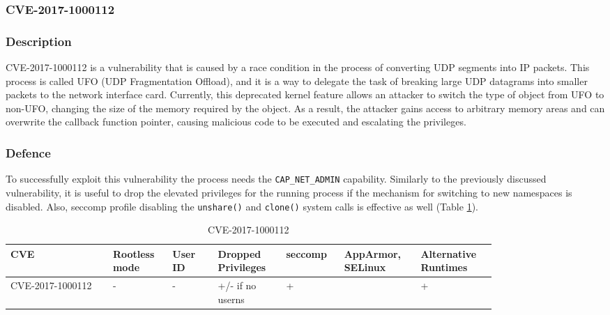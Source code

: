 \subsubsection{CVE-2017-1000112}
\subsubsection*{Description}

CVE-2017-1000112 is a vulnerability that is caused by a race condition in the process of converting UDP segments into IP packets. This process is called UFO (UDP Fragmentation Offload), and it is a way to delegate the task of breaking large UDP datagrams into smaller packets to the network interface card. Currently, this deprecated kernel feature allows an attacker to switch the type of object from UFO to non-UFO, changing the size of the memory required by the object. As a result, the attacker gains access to arbitrary memory areas and can overwrite the callback function pointer, causing malicious code to be executed and escalating the privileges.

\subsubsection*{Defence}

To successfully exploit this vulnerability the process needs the \texttt{CAP\_NET\_ADMIN} capability. Similarly to the previously discussed vulnerability, it is useful to drop the elevated privileges for the running process if the mechanism for switching to new namespaces is disabled. Also, seccomp profile disabling the \texttt{unshare()} and \texttt{clone()} system calls is effective as well (Table \ref{tab:h:7}).

\begin{table}[H]
    \centering \small
    \begin{tabular}{| p{0.18\linewidth} | p{0.1\linewidth} | p{0.08\linewidth} | p{0.12\linewidth} | p{0.09\linewidth} | p{0.12\linewidth} | p{0.12\linewidth} |} \hline
    CVE & Rootless mode & User ID & Dropped Privileges & seccomp & AppArmor, SELinux & Alternative Runtimes \\ \hline
    CVE-2017-1000112 & - & - & \cellcolor{yellow!25} +/- \linebreak if no userns & \cellcolor{green!25} + &  & \cellcolor{green!25} + \\ \hline
    \end{tabular}
    \caption{CVE-2017-1000112}
    \label{tab:h:7}
\end{table}


